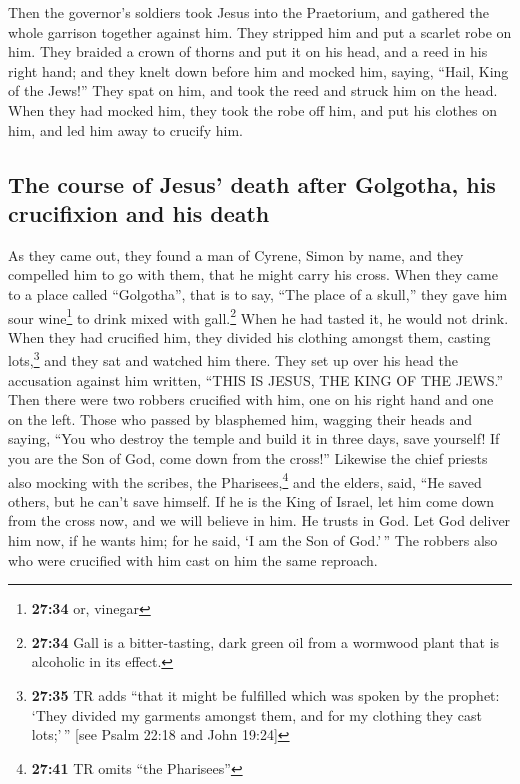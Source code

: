  Then the governor's soldiers took Jesus into the
Praetorium, and gathered the whole garrison together against him.
 They stripped him and put a scarlet robe on him.
 They braided a crown of thorns and put it on his head,
and a reed in his right hand; and they knelt down before him and mocked
him, saying, ``Hail, King of the Jews!''  They spat on
him, and took the reed and struck him on the head.  When
they had mocked him, they took the robe off him, and put his clothes on
him, and led him away to crucify him.

\hypertarget{the-course-of-jesus-death-after-golgotha-his-crucifixion-and-his-death}{%
\subsection{The course of Jesus' death after Golgotha, his crucifixion
and his
death}\label{the-course-of-jesus-death-after-golgotha-his-crucifixion-and-his-death}}

 As they came out, they found a man of Cyrene, Simon by
name, and they compelled him to go with them, that he might carry his
cross.  When they came to a place called ``Golgotha'',
that is to say, ``The place of a skull,''  they gave him
sour wine\footnote{\textbf{27:34} or, vinegar} to drink mixed with
gall.\footnote{\textbf{27:34} Gall is a bitter-tasting, dark green oil
  from a wormwood plant that is alcoholic in its effect.} When he had
tasted it, he would not drink.  When they had crucified
him, they divided his clothing amongst them, casting lots,\footnote{\textbf{27:35}
  TR adds ``that it might be fulfilled which was spoken by the prophet:
  `They divided my garments amongst them, and for my clothing they cast
  lots;'\,'' {[}see Psalm 22:18 and John 19:24{]}}  and
they sat and watched him there.  They set up over his
head the accusation against him written, ``THIS IS JESUS, THE KING OF
THE JEWS.''  Then there were two robbers crucified with
him, one on his right hand and one on the left.  Those
who passed by blasphemed him, wagging their heads  and
saying, ``You who destroy the temple and build it in three days, save
yourself! If you are the Son of God, come down from the cross!''
 Likewise the chief priests also mocking with the
scribes, the Pharisees,\footnote{\textbf{27:41} TR omits ``the
  Pharisees''} and the elders, said,  ``He saved others,
but he can't save himself. If he is the King of Israel, let him come
down from the cross now, and we will believe in him.  He
trusts in God. Let God deliver him now, if he wants him; for he said, `I
am the Son of God.'\,''  The robbers also who were
crucified with him cast on him the same reproach.

